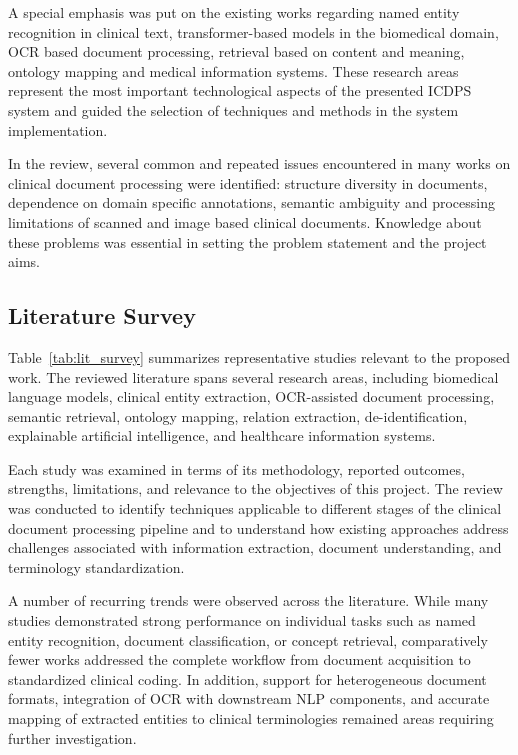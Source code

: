 A special emphasis was put on the existing works regarding named entity recognition in clinical text, transformer-based models in the biomedical domain, OCR based document processing, retrieval based on content and meaning, ontology mapping and medical information systems. These research areas represent the most important technological aspects of the presented ICDPS system and guided the selection of techniques and methods in the system implementation.

In the review, several common and repeated issues encountered in many works on clinical document processing were identified: structure diversity in documents, dependence on domain specific annotations, semantic ambiguity and processing limitations of scanned and image based clinical documents. Knowledge about these problems was essential in setting the problem statement and the project aims.

\subsection[Literature Survey]{\textbf{Literature Survey}}

Table~\ref{tab:lit_survey} summarizes representative studies relevant to the proposed work. The reviewed literature spans several research areas, including biomedical language models, clinical entity extraction, OCR-assisted document processing, semantic retrieval, ontology mapping, relation extraction, de-identification, explainable artificial intelligence, and healthcare information systems.

Each study was examined in terms of its methodology, reported outcomes, strengths, limitations, and relevance to the objectives of this project. The review was conducted to identify techniques applicable to different stages of the clinical document processing pipeline and to understand how existing approaches address challenges associated with information extraction, document understanding, and terminology standardization.

A number of recurring trends were observed across the literature. While many studies demonstrated strong performance on individual tasks such as named entity recognition, document classification, or concept retrieval, comparatively fewer works addressed the complete workflow from document acquisition to standardized clinical coding. In addition, support for heterogeneous document formats, integration of OCR with downstream NLP components, and accurate mapping of extracted entities to clinical terminologies remained areas requiring further investigation.

